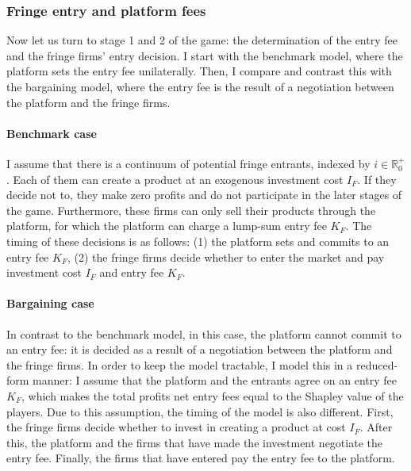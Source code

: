 \documentclass[a4paper]{article}
\begin{document}
\subsubsection{Fringe entry and platform fees}

Now let us turn to stage 1 and 2 of the game: the determination of the entry fee and the fringe firms' entry decision.
I start with the benchmark model, where the platform sets the entry fee unilaterally.
Then, I compare and contrast this with the bargaining model, where the entry fee is the result of a negotiation between the platform and the fringe firms.

\paragraph{Benchmark case}

I assume that there is a continuum of potential fringe entrants, indexed by $i \in \mathbb{R}^+_0$.
Each of them can create a product at an exogenous investment cost $I_F$.
If they decide not to, they make zero profits and do not participate in the later stages of the game.
Furthermore, these firms can only sell their products through the platform, for which the platform can charge a lump-sum entry fee $K_F$.
The timing of these decisions is as follows: (1) the platform sets and commits to an entry fee $K_F$, (2) the fringe firms decide whether to enter the market and pay investment cost $I_F$ and entry fee $K_F$.

\paragraph{Bargaining case}
\label{sec:model_bargaining}

In contrast to the benchmark model, in this case, the platform cannot commit to an entry fee: it is decided as a result of a negotiation between the platform and the fringe firms.
In order to keep the model tractable, I model this in a reduced-form manner: I assume that the platform and the entrants agree on an entry fee $K_F$, which makes the total profits net entry fees equal to the Shapley value of the players.
Due to this assumption, the timing of the model is also different.
First, the fringe firms decide whether to invest in creating a product at cost $I_F$.
After this, the platform and the firms that have made the investment negotiate the entry fee.
Finally, the firms that have entered pay the entry fee to the platform.
\end{document}
